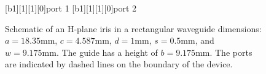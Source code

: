 \begin{figure}[!h]
 \centering
 [b1][1][1][0]{port 1}
 [b1][1][1][0]{port 2}
 {}
 \caption{Schematic of an H-plane iris in a rectangular waveguide dimensions: $a=18.35\text{mm}$, $c=4.587\text{mm}$, $d=1\text{mm}$, $s=0.5\text{mm}$, and $w=9.175\text{mm}$. The guide has a height of $b=9.175\text{mm}$. The ports are indicated by dashed lines on the boundary of the device.}
 \label{lezar:fig:h_plane_iris}
\end{figure}

